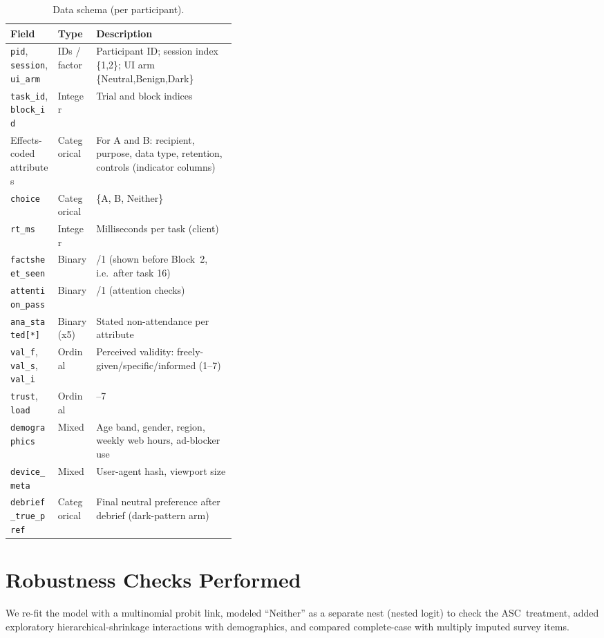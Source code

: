 \documentclass{eusset}
\newcommand{\ASC}{ASC}
\begin{document}
\label{app:planning}
\begin{table}[ht]
  \centering
  \begin{tabularx}{\columnwidth}{@{} p{0.21\linewidth} p{0.17\linewidth} >{\raggedright\arraybackslash}X @{}}
    \textbf{Field} & \textbf{Type} & \textbf{Description} \\
    \hline
    \texttt{pid}, \texttt{session}, \texttt{ui\_arm} & IDs / factor & Participant ID; session index \{1,2\}; UI arm \{Neutral,Benign,Dark\} \\
    \texttt{task\_id}, \texttt{block\_id} & Integer & Trial and block indices \\
    Effects-coded attributes & Categorical & For A and B: recipient, purpose, data type, retention, controls (indicator columns) \\
    \texttt{choice} & Categorical & \{A, B, Neither\} \\
    \texttt{rt\_ms} & Integer & Milliseconds per task (client) \\
    \texttt{factsheet\_seen} & Binary & 0/1 (shown before Block~2, i.e.\ after task 16) \\
    \texttt{attention\_pass} & Binary & 0/1 (attention checks) \\
    \texttt{ana\_stated[*]} & Binary (x5) & Stated non-attendance per attribute \\
    \texttt{val\_f}, \texttt{val\_s}, \texttt{val\_i} & Ordinal & Perceived validity: freely-given/specific/informed (1--7) \\
    \texttt{trust}, \texttt{load} & Ordinal & 1--7 \\
    \texttt{demographics} & Mixed & Age band, gender, region, weekly web hours, ad-blocker use \\
    \texttt{device\_meta} & Mixed & User-agent hash, viewport size \\
    \texttt{debrief\_true\_pref} & Categorical & Final neutral preference after debrief (dark-pattern arm) \\
  \end{tabularx}
  \caption{Data schema (per participant).}
  \label{tab:schema}
\end{table}

\section{Robustness Checks Performed}
We re-fit the model with a multinomial probit link, modeled ``Neither'' as a separate nest (nested logit) to check the \ASC\ treatment, added exploratory hierarchical-shrinkage interactions with demographics, and compared complete-case with multiply imputed survey items.
\end{document}
